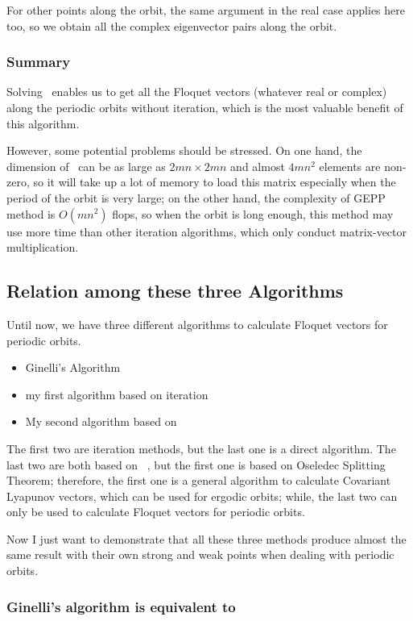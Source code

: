 For other points along the orbit, the same argument in the real case applies
here too, so we obtain all the complex eigenvector pairs along the orbit.

\subsubsection{Summary}
Solving \pse\ enables us to get all the Floquet vectors (whatever real
or complex) along the periodic
orbits without iteration, which is the most valuable
 benefit of this algorithm.

 However, some potential problems should be
stressed. On one hand, the dimension of \psm\ can be as large as
$2mn\times 2mn$ and almost $4mn^{2}$ elements are non-zero, so it will
take up a lot of memory to load this matrix especially when the period of
the orbit is very large; on the other hand, the complexity of GEPP method
is $O(mn^2)$ flops, so when the orbit is long enough, this method may use
more time than other iteration algorithms, which only conduct matrix-vector
multiplication.

\subsection{Relation among these three Algorithms}
Until now, we have three different algorithms to calculate Floquet vectors
for periodic orbits.
\begin{itemize}
\item Ginelli's Algorithm 
\item my first algorithm based on iteration
\item My second algorithm based on \pse\
\end{itemize}

The first two are iteration methods, but the last one is a direct
algorithm. The last two are both based on \psd\ , but the first
one is based on Oseledec Splitting Theorem; therefore, the
 first one is a general
algorithm to calculate Covariant Lyapunov vectors, which can be used
for ergodic orbits; while, the last two can only be used to calculate
Floquet vectors for periodic orbits.

Now I just want to demonstrate that
all these three methods produce almost the same result with their own
strong and weak points when dealing with periodic orbits.

\vspace{2em}
\subsubsection{Ginelli's algorithm is equivalent to \psd\ }

